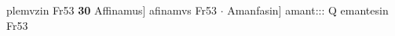 \documentclass[8pt,a4paper,notitlepage]{article}
\begin{document}
\begin{table}[ht]
\begin{minipage}[t]{0.5\linewidth}
plemvzin Fr53 \textbf{30} Affinamus] afinamvs Fr53  $\cdot$ Amanfasin] amant::: Q emantesin Fr53 \newline
\end{minipage}
\end{table}
\end{document}
